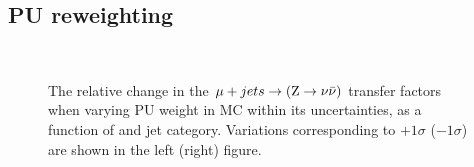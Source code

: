 \clearpage
\subsection{PU reweighting}

\begin{figure}[!h]
  \centering
   ~~
  \\

  \caption{\label{fig:tfSyst_pu_muToZinv} The relative change in the
  $\mj \rightarrow (\znunu)$ transfer
  factors when varying PU weight in MC within its uncertainties, as a function of \scalht and jet category. 
  Variations corresponding to $+1\sigma$ ($-1\sigma$) are shown in the left (right) figure. 
  }
\end{figure}

